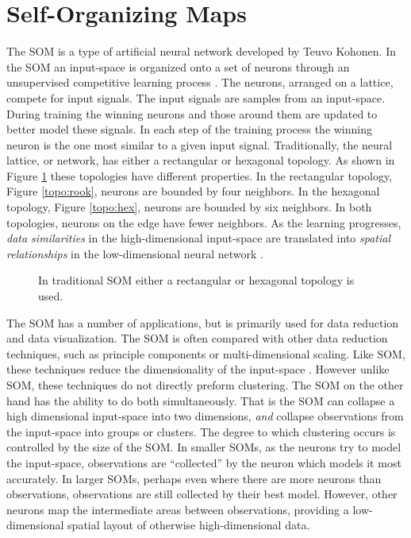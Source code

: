 \section{Self-Organizing Maps}
\label{bg:som}
The SOM is a type of artificial neural network developed by Teuvo Kohonen.  In
the SOM an input-space is organized onto a set of neurons through an
unsupervised competitive learning process \citep{Kohonen2000}. The neurons, arranged on a lattice,
compete for input signals.  The input signals are samples from an input-space.
During training the winning neurons and those around them are updated to
better model these signals. In each step of the training process the winning
neuron is the one most similar to a given input signal.  Traditionally, the
neural lattice, or network, has either a rectangular or hexagonal topology.  As shown in
Figure \ref{topos} these topologies have different properties.  In the
rectangular topology, Figure \ref{topo:rook}, neurons are bounded by four
neighbors.  In the hexagonal topology, Figure \ref{topo:hex}, neurons are
bounded by six neighbors.  In both topologies, neurons on the edge have fewer
neighbors.  As the learning progresses, \emph{data similarities} in the
high-dimensional input-space are translated into \emph{spatial relationships}
in the low-dimensional neural network \citep{ritter99}.

\begin{figure}
\centering
{}
\caption{In traditional SOM either a rectangular or hexagonal topology is used.}
\label{topos}
\end{figure}

The SOM has a number of applications, but is primarily used for data reduction
and data visualization.  The SOM is often compared with other data reduction
techniques, such as principle components or multi-dimensional scaling. Like
SOM, these techniques reduce the dimensionality of the input-space
\citep{Kohonen2000,skupin08}. However unlike SOM, these techniques do not
directly preform clustering.  The SOM on the other hand has the ability to do
both simultaneously.  That is the SOM can collapse a high dimensional
input-space into two dimensions, \emph{and} collapse observations from the
input-space into groups or clusters.  The degree to which clustering occurs is
controlled by the size of the SOM.  In smaller SOMs, as the neurons try to
model the input-space, observations are ``collected'' by the neuron which
models it most accurately.  In larger SOMs, perhaps even where there are more
neurons than observations, observations are still collected by their best
model.  However, other neurons map the intermediate areas between
observations, providing a low-dimensional spatial layout of otherwise
high-dimensional data.

